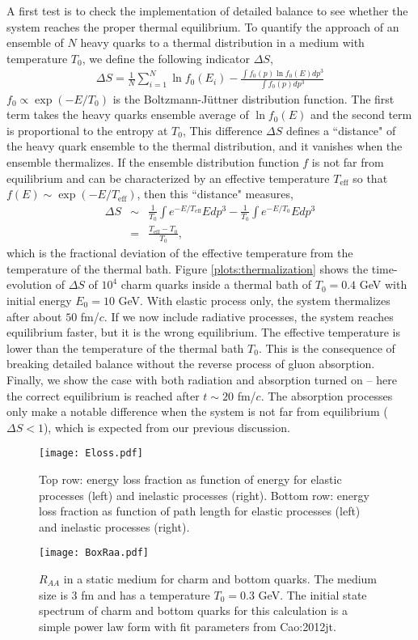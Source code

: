 A first test is to check the implementation of detailed balance to see whether the system reaches the proper thermal equilibrium.
To quantify the approach of an ensemble of $N$ heavy quarks to a thermal distribution in a medium with temperature $T_0$, we define the following indicator $\Delta S$,
\begin{eqnarray}
\Delta S = \frac{1}{N}\sum_{i=1}^{N} \ln f_0(E_i) - \frac{\int f_0(p)\ln f_0(E) dp^3}{\int f_0(p) dp^3}
\end{eqnarray}
$f_0 \propto \exp(-E/T_0)$ is the Boltzmann-J\"uttner distribution function. 
The first term takes the heavy quarks ensemble average of $\ln f_0(E)$ and the second term is proportional to the entropy at $T_0$,
This difference $\Delta S$ defines a ``distance" of the heavy quark ensemble to the thermal distribution, and it vanishes when the ensemble thermalizes.
If the ensemble distribution function $f$ is not far from equilibrium and can be characterized by an effective temperature $T_{\textrm{eff}}$ so that $f(E)\sim \exp(-E/T_{\textrm{eff}})$, then this ``distance" measures,
\begin{eqnarray}
\nonumber
\Delta S &\sim& \frac{1}{T_0}\int  e^{-E/T_{\textrm{eff}}} E dp^3 - \frac{1}{T_0}\int e^{-E/T_0} E dp^3 \\
&=& \frac{T_\textrm{eff}-T_0}{T_0},
\end{eqnarray}
which is the fractional deviation of the effective temperature from the temperature of the thermal bath.
Figure \ref{plots:thermalization} shows the time-evolution of $\Delta S$ of $10^4$ charm quarks inside a thermal bath of $T_0=0.4$ GeV with initial energy $E_0 = 10$ GeV.
With elastic process only, the system thermalizes after about $50$ fm/$c$.
If we now include radiative processes, the system reaches equilibrium faster, but it is the wrong equilibrium.
The effective temperature is lower than the temperature of the thermal bath $T_0$.
This is the consequence of breaking detailed balance without the reverse process of gluon absorption.
Finally, we show the case with both radiation and absorption turned on -- here the correct equilibrium is reached after $t\sim 20$ fm/$c$.
The absorption processes only make a notable difference when the system is not far from equilibrium ($\Delta S < 1$), which is expected from our previous discussion.
\begin{figure}
\texttt{[image: Eloss.pdf]}
\caption{Top row: energy loss fraction as function of energy for elastic processes (left) and inelastic processes (right). Bottom row: energy loss fraction as function of path length for elastic processes (left) and inelastic processes (right).}\label{plots:dEE}
\end{figure}
\begin{figure}
\texttt{[image: BoxRaa.pdf]}
\caption{$R_{AA}$ in a static medium for charm and bottom quarks. The medium size  is $3$ fm and has a temperature $T_0 = 0.3$ GeV. The initial state spectrum of charm and bottom quarks for this calculation is a simple power law form with fit parameters from {Cao:2012jt}.}\label{plots:BoxRaa}
\end{figure}

